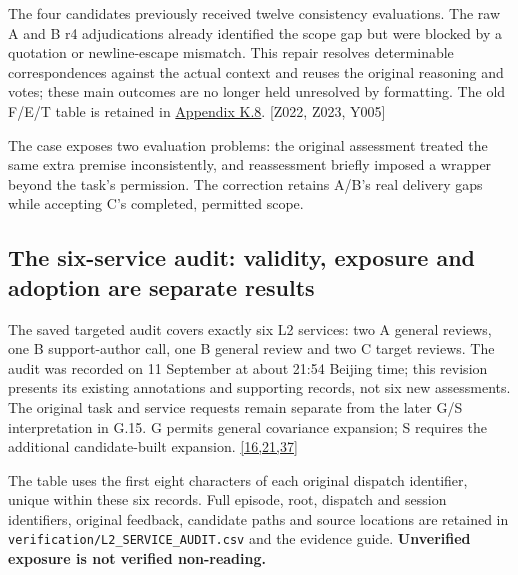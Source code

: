 The four candidates previously received twelve consistency evaluations. The raw A and B r4 adjudications already identified the scope gap but were blocked by a quotation or newline-escape mismatch. This repair resolves determinable correspondences against the actual context and reuses the original reasoning and votes; these main outcomes are no longer held unresolved by formatting. The old F/E/T table is retained in \hyperlink{k8}{Appendix K.8}. [Z022, Z023, Y005]

The case exposes two evaluation problems: the original assessment treated the same extra premise inconsistently, and reassessment briefly imposed a wrapper beyond the task's permission. The correction retains A/B's real delivery gaps while accepting C's completed, permitted scope.

\subsection[The six-service audit: validity, exposure and adoption are separate results]{\texorpdfstring{\protect\hypertarget{g18}{}The six-service audit: validity, exposure and adoption are separate results}{The six-service audit: validity, exposure and adoption are separate results}}
The saved targeted audit covers exactly six L2 services: two A general reviews, one B support-author call, one B general review and two C target reviews. The audit was recorded on 11 September at about 21:54 Beijing time; this revision presents its existing annotations and supporting records, not six new assessments. The original task and service requests remain separate from the later G/S interpretation in G.15. G permits general covariance expansion; S requires the additional candidate-built expansion. \href{en.pdf\#ref-16}{\mbox{[16,21,37]}}

The table uses the first eight characters of each original dispatch identifier, unique within these six records. Full episode, root, dispatch and session identifiers, original feedback, candidate paths and source locations are retained in \nolinkurl{verification/L2_SERVICE_AUDIT.csv} and the evidence guide. \textbf{Unverified exposure is not verified non-reading.}

